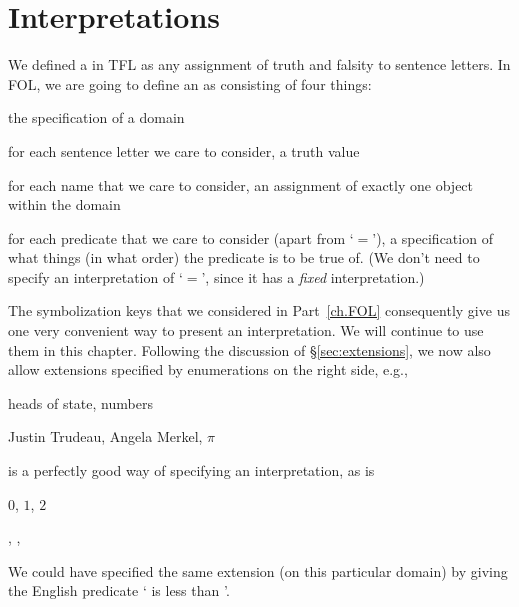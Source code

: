 \section{Interpretations}
We defined a  in TFL as any assignment of truth and falsity to sentence letters. In FOL, we are going to define an  as consisting of four things:
	\begin{ebullet}
		\item the specification of a domain
		\item for each sentence letter we care to consider, a truth value
		\item for each name that we care to consider, an assignment of exactly one object within the domain
		\item for each predicate that we care to consider (apart from `$=$'), a specification of what things (in what order) the predicate is to be true of. (We don't need to specify an interpretation of `$=$', since it has a \emph{fixed} interpretation.)
	\end{ebullet}
The symbolization keys that we considered in Part~\ref{ch.FOL} consequently give us one very convenient way to present an interpretation. We will continue to use them in this chapter. Following the discussion of \S\ref{sec:extensions}, we now also allow extensions specified by enumerations on the right side, e.g.,
\begin{ekey}
	\item[\text{domain}] heads of state, numbers
	\item[\atom{H}{x}] Justin Trudeau, Angela Merkel, $\pi$
\end{ekey}
is a perfectly good way of specifying an interpretation, as is
\begin{ekey}
	\item[\text{domain}] $0$, $1$, $2$
	\item[\atom{L}{x,y}] , , 
\end{ekey}
We could have specified the same extension (on this particular domain) by giving the English predicate ` is less than '.



